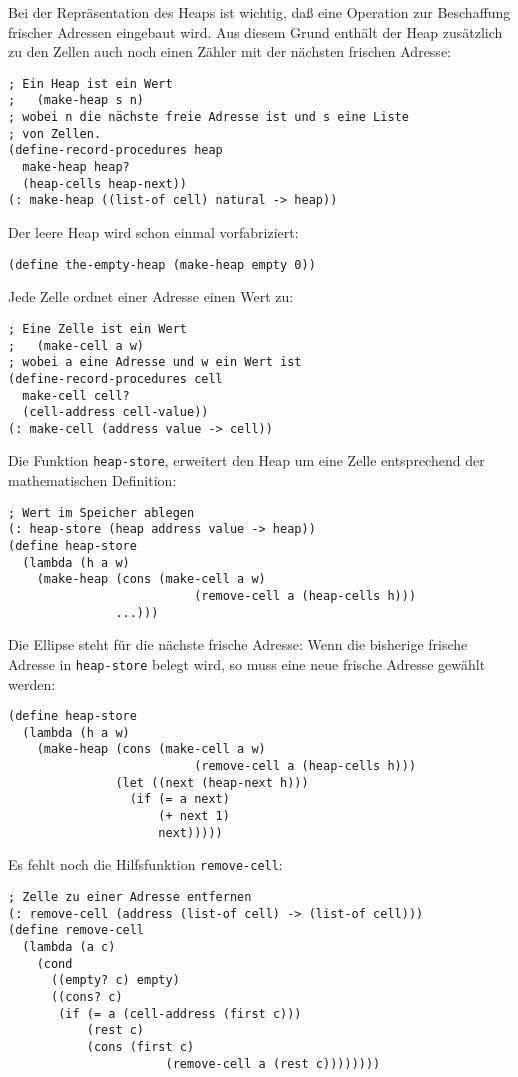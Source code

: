 %
Bei der Repräsentation des Heaps ist wichtig, daß eine Operation zur
Beschaffung frischer Adressen eingebaut wird.  Aus diesem Grund
enthält der Heap zusätzlich zu den Zellen auch noch einen Zähler mit
der nächsten frischen Adresse:
%
\begin{verbatim}
; Ein Heap ist ein Wert
;   (make-heap s n)
; wobei n die nächste freie Adresse ist und s eine Liste
; von Zellen.
(define-record-procedures heap
  make-heap heap?
  (heap-cells heap-next))
(: make-heap ((list-of cell) natural -> heap))
\end{verbatim}
%
Der leere Heap wird schon einmal vorfabriziert:
%
\begin{verbatim}
(define the-empty-heap (make-heap empty 0))
\end{verbatim}
%
Jede Zelle ordnet einer Adresse einen Wert zu:
%
\begin{verbatim}
; Eine Zelle ist ein Wert
;   (make-cell a w)
; wobei a eine Adresse und w ein Wert ist
(define-record-procedures cell
  make-cell cell?
  (cell-address cell-value))
(: make-cell (address value -> cell))
\end{verbatim}
%
Die Funktion \texttt{heap-store}, erweitert den Heap um eine Zelle
entsprechend der mathematischen Definition:
%
\begin{verbatim}
; Wert im Speicher ablegen
(: heap-store (heap address value -> heap))
(define heap-store
  (lambda (h a w)
    (make-heap (cons (make-cell a w)
                          (remove-cell a (heap-cells h)))
               ...)))
\end{verbatim}
%
Die Ellipse steht für die nächste frische Adresse: Wenn die bisherige
frische Adresse in \texttt{heap-store} belegt wird, so muss eine neue
frische Adresse gewählt werden:
%
\begin{verbatim}
(define heap-store
  (lambda (h a w)
    (make-heap (cons (make-cell a w)
                          (remove-cell a (heap-cells h)))
               (let ((next (heap-next h)))
                 (if (= a next)
                     (+ next 1)
                     next)))))
\end{verbatim}
%
Es fehlt noch die Hilfsfunktion \texttt{remove-cell}:
%
\begin{verbatim}
; Zelle zu einer Adresse entfernen
(: remove-cell (address (list-of cell) -> (list-of cell)))
(define remove-cell
  (lambda (a c)
    (cond
      ((empty? c) empty)
      ((cons? c)
       (if (= a (cell-address (first c)))
           (rest c)
           (cons (first c)
                      (remove-cell a (rest c))))))))
\end{verbatim}
